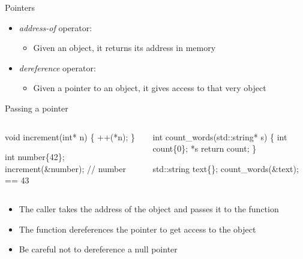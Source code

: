 \begin{frame}[fragile]{Pointers \insertcontinuationtext}

  \begin{itemize}
  \item<1-> \textit{address-of} operator: \alert{\code{\&}}
    \begin{itemize}
    \item Given an object, it returns its address in memory
    \end{itemize}
  \item<2-> \textit{dereference} operator: \alert{\code{*}}
    \begin{itemize}
    \item Given a pointer to an object, it gives access to that very object
    \end{itemize}
  \end{itemize}
\end{frame}

\begin{frame}[fragile]{Passing a pointer}

  \begin{columns}[T]
    \begin{column}{.5\textwidth}
      \begin{codeblock}
void increment(int\alert{*} n) \{
  ++(\alert{*}n);
\}

int number\{42\};
increment(\alert{&}number);
// number == 43\end{codeblock}
      
    \end{column}
    \begin{column}{.5\textwidth}
      \begin{codeblock}
int count_words(std::string\alert{*} s)
\{
  int count\{0\};
  \ddd \alert{*}s \ddd
  return count;
\}

std::string text\{\ddd\};
count_words(\alert{&}text);\end{codeblock}
    \end{column}
  \end{columns}

  \begin{itemize}
  \item The caller takes the address of the object and passes it to the function
  \item The function dereferences the pointer to get access to the object
  \item Be careful not to dereference a null pointer
  \end{itemize}

\end{frame}

